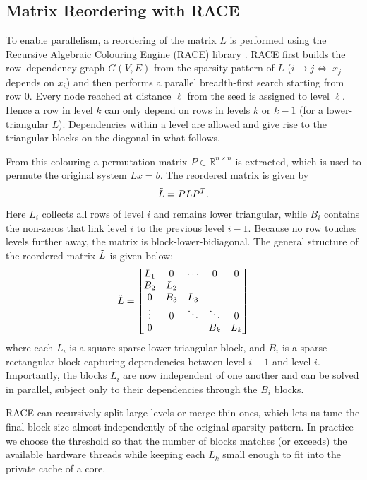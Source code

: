 \subsection{Matrix Reordering with RACE}
To enable parallelism, a reordering of the matrix $L$ is performed using the Recursive Algebraic Colouring Engine (RACE) library \cite{10.1145/3399732}. RACE first builds the row–dependency graph
$G(V,E)$ from the sparsity pattern of $L$ ($i \to j \Leftrightarrow\;
x_j$ depends on $x_i$) and then performs a parallel breadth-first search starting from row 0.  
Every node reached at distance $\ell$ from the seed is assigned to level $\ell$.  Hence a row in level $k$ can only depend on rows
in levels $k$ or $k-1$ (for a lower-triangular $L$).  Dependencies within a level are allowed and give rise to the triangular blocks
on the diagonal in what follows.

From this colouring a permutation matrix $P \in \mathbb{R}^{n \times n}$ is extracted, which is used to permute the original system $Lx=b$. The reordered matrix is given by \begin{align}
    \Tilde{L} = P L P^T.
\end{align}
Here $L_i$ collects all rows of level $i$ and remains lower triangular,
while $B_i$ contains the non-zeros that link level $i$ to the previous
level $i{-}1$.  Because no row touches levels further away, the matrix is
block-lower-bidiagonal. The general structure of the reordered matrix $\Tilde{L}$ is given below:
\begin{align}
    \begin{array}{c} \Tilde{L} =
        \begin{bmatrix}
         L_1&0 & \cdots& 0& 0\\
         B_2&L_2 & & & \\
         0& B_3&L_3 & & \\
         \vdots& 0&\ddots &\ddots & 0\\
         0& & &B_k &L_k 
    \end{bmatrix} \end{array}
\end{align}
where each $L_i$ is a square sparse lower triangular block, and $B_i$ is a sparse rectangular block capturing dependencies between level $i-1$ and level $i$. Importantly, the blocks $L_i$ are now independent of one another and can be solved in parallel, subject only to their dependencies through the $B_i$ blocks.

RACE can recursively split large levels or merge thin ones, which lets us
tune the final block size almost independently of the original sparsity
pattern.  In practice we choose the threshold so that the number of
blocks matches (or exceeds) the available hardware threads while keeping
each $L_k$ small enough to fit into the private cache of a core.

